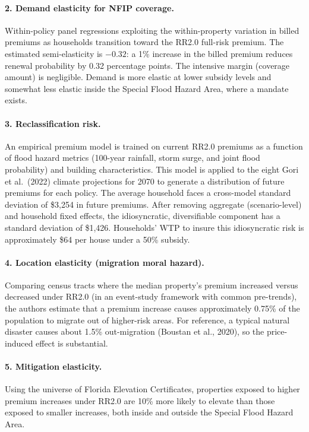 \documentclass[12pt]{article}
\begin{document}
\paragraph{2. Demand elasticity for NFIP coverage.}
Within-policy panel regressions exploiting the within-property variation in billed premiums as households transition toward the RR2.0 full-risk premium. The estimated semi-elasticity is $-0.32$: a 1\% increase in the billed premium reduces renewal probability by 0.32 percentage points. The intensive margin (coverage amount) is negligible. Demand is more elastic at lower subsidy levels and somewhat less elastic inside the Special Flood Hazard Area, where a mandate exists.

\paragraph{3. Reclassification risk.}
An empirical premium model is trained on current RR2.0 premiums as a function of flood hazard metrics (100-year rainfall, storm surge, and joint flood probability) and building characteristics. This model is applied to the eight Gori et al.\ (2022) climate projections for 2070 to generate a distribution of future premiums for each policy. The average household faces a cross-model standard deviation of \$3,254 in future premiums. After removing aggregate (scenario-level) and household fixed effects, the idiosyncratic, diversifiable component has a standard deviation of \$1,426. Households' WTP to insure this idiosyncratic risk is approximately \$64 per house under a 50\% subsidy.

\paragraph{4. Location elasticity (migration moral hazard).}
Comparing census tracts where the median property's premium increased versus decreased under RR2.0 (in an event-study framework with common pre-trends), the authors estimate that a premium increase causes approximately 0.75\% of the population to migrate out of higher-risk areas. For reference, a typical natural disaster causes about 1.5\% out-migration (Boustan et al., 2020), so the price-induced effect is substantial.

\paragraph{5. Mitigation elasticity.}
Using the universe of Florida Elevation Certificates, properties exposed to higher premium increases under RR2.0 are 10\% more likely to elevate than those exposed to smaller increases, both inside and outside the Special Flood Hazard Area.
\end{document}
